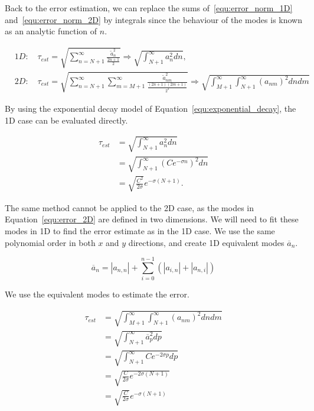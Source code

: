 Back to the error estimation, we can replace the sums of~\ref{equ:error_norm_1D}
and~\ref{equ:error_norm_2D} by integrals since the behaviour of the modes is known as an analytic
function of \(n\).

\begin{align}
	&1D: \quad \tau_{est} = \sqrt{\sum_{n = N + 1}^{\infty } \frac{\widetilde{a}_n^2}{\frac{2n + 1}{2}}} 
			   \Rightarrow \sqrt{\int_{N + 1}^{\infty } a_n^2 dn}, \label{equ:error_1D}
	\\
	&2D: \quad \tau_{est} = \sqrt{\sum_{n = N + 1}^{\infty }\sum_{m = M + 1}^{\infty}\frac{\widetilde{a}^2_{nm}}{\frac{(2n + 1)(2m + 1)}{2^2}}}
			   \Rightarrow \sqrt{\int_{M+1}^{\infty }\int_{N + 1 }^{\infty}{(a_{nm})}^2 dn dm} \label{equ:error_2D}
\end{align}

\noindent
By using the exponential decay model of Equation~\ref{equ:exponential_decay}, the 1D case can be
evaluated directly.

\begin{equation}
	\begin{aligned}
		\tau_{est} &= \sqrt{\int_{N + 1}^{\infty } a_n^2 dn} \\
		&= \sqrt{\int_{N + 1}^{\infty } {\left( Ce^{-\sigma n} \right)}^2 dn} \\
		&= \sqrt{\frac{C^2}{2\sigma }}e^{-\sigma (N + 1)}. 
	\end{aligned}
\end{equation}

The same method cannot be applied to the 2D case, as the modes in Equation~\ref{equ:error_2D} are
defined in two dimensions. We will need to fit these modes in 1D to find the error estimate as in
the 1D case. We use the same polynomial order in both \(x\) and \(y\) directions, and create 1D
equivalent modes \(\overline{a}_n\). 

\begin{equation}
	\overline{a}_n = \left| a_{n,n} \right| + \sum_{i = 0}^{n-1} \left( \left| a_{i, n} \right| + \left| a_{n, i} \right| \right)
\end{equation}

\noindent
We use the equivalent modes to estimate the error.

\begin{equation}
	\begin{aligned}
		\tau_{est} &= \sqrt{\int_{M+1}^{\infty }\int_{N + 1 }^{\infty}{(a_{nm})}^2 dn dm} \\
		&= \sqrt{\int_{N + 1}^{\infty }\overline{a}_p^2 dp} \\
		&= \sqrt{\int_{N + 1}^{\infty} Ce^{-2\sigma p}dp} \\
		&= \sqrt{\frac{C}{2\sigma}e^{-2\sigma(N + 1)}} \\
		&= \sqrt{\frac{C}{2\sigma}} e^{-\sigma (N + 1)}
	\end{aligned}
\end{equation}

